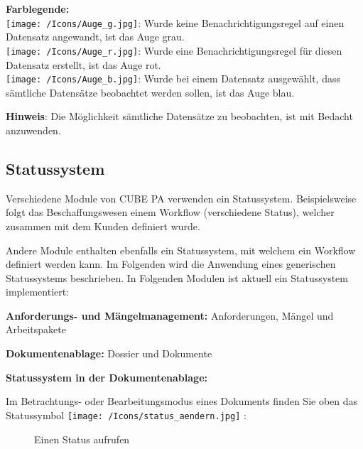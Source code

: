 \pagebreak
\textbf{Farblegende:}\\
\texttt{[image: /Icons/Auge\_g.jpg]}: Wurde keine Benachrichtigungsregel auf einen Datensatz angewandt, ist das Auge grau.\\
\texttt{[image: /Icons/Auge\_r.jpg]}: Wurde eine Benachrichtigungsregel für diesen Datensatz erstellt, ist das Auge rot.\\
\texttt{[image: /Icons/Auge\_b.jpg]}: Wurde bei einem Datensatz ausgewählt, dass sämtliche Datensätze beobachtet werden sollen, ist das Auge blau.

\vspace{\baselineskip}

\textbf{Hinweis}: Die Möglichkeit sämtliche Datensätze zu beobachten, ist mit Bedacht anzuwenden.

\subsection{Statussystem} %
\label{bkm:Ref2018073101}

Verschiedene Module von CUBE PA verwenden ein Statussystem. Beispielsweise folgt das Beschaffungswesen einem Workflow (verschiedene Status), welcher zusammen mit dem Kunden definiert wurde.

Andere Module enthalten ebenfalls ein Statussystem, mit welchem ein Workflow definiert werden kann. Im Folgenden wird die Anwendung eines generischen Statussystems beschrieben. In Folgenden Modulen ist aktuell ein Statussystem implementiert:

\vspace{\baselineskip}

\begin{compactitem}
	\item \textbf{Anforderungs- und Mängelmanagement:} Anforderungen, Mängel und Arbeitspakete
	\item \textbf{Dokumentenablage:} Dossier und Dokumente
\end{compactitem}

\vspace{\baselineskip}

\textbf{Statussystem in der Dokumentenablage:}

\vspace{\baselineskip}

Im Betrachtungs- oder Bearbeitungsmodus eines Dokuments finden Sie oben das Statussymbol \texttt{[image: /Icons/status\_aendern.jpg]} : 

\begin{figure}[H]
\caption{Einen Status aufrufen}
\end{figure}

